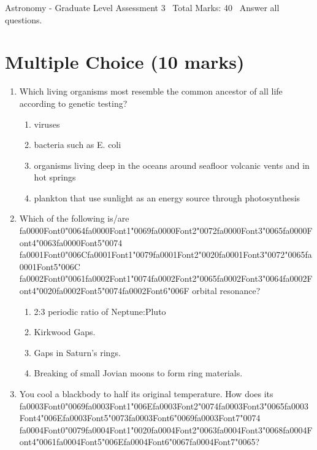 \documentclass[12pt]{article}
\begin{document}
\begin{center}
Astronomy - Graduate Level Assessment 3 \
Total Marks: 40 \
Answer all questions.
\end{center}

\section*{Multiple Choice (10 marks)}
\begin{enumerate}[label=\arabic*.]
\item Which living organisms most resemble the common ancestor of all life according to genetic
testing?
\begin{enumerate}[label=(\alph*)]
    \item viruses
    \item bacteria such as E. coli
    \item organisms living deep in the oceans around seafloor volcanic vents and in hot springs
    \item plankton that use sunlight as an energy source through photosynthesis
\end{enumerate}
\item Which of the following is/are {\csname fa0000Font0\endcsname\char"0064}{\csname fa0000Font1\endcsname\char"0069}{\csname fa0000Font2\endcsname\char"0072}{\csname fa0000Font3\endcsname\char"0065}{\csname fa0000Font4\endcsname\char"0063}{\csname fa0000Font5\endcsname\char"0074} {\csname fa0001Font0\endcsname\char"006C}{\csname fa0001Font1\endcsname\char"0079}{\csname fa0001Font2\endcsname\char"0020}{\csname fa0001Font3\endcsname\char"0072}{\char"0065}{\csname fa0001Font5\endcsname\char"006C} {\csname fa0002Font0\endcsname\char"0061}{\csname fa0002Font1\endcsname\char"0074}{\csname fa0002Font2\endcsname\char"0065}{\csname fa0002Font3\endcsname\char"0064}{\csname fa0002Font4\endcsname\char"0020}{\csname fa0002Font5\endcsname\char"0074}{\csname fa0002Font6\endcsname\char"006F} orbital resonance?
\begin{enumerate}[label=(\alph*)]
    \item 2:3 periodic ratio of Neptune:Pluto
    \item Kirkwood Gaps.
    \item Gaps in Saturn's rings.
    \item Breaking of small Jovian moons to form ring materials.
\end{enumerate}
\item You cool a blackbody to half its original temperature. How does its {\csname fa0003Font0\endcsname\char"0069}{\csname fa0003Font1\endcsname\char"006E}{\csname fa0003Font2\endcsname\char"0074}{\csname fa0003Font3\endcsname\char"0065}{\csname fa0003Font4\endcsname\char"006E}{\csname fa0003Font5\endcsname\char"0073}{\csname fa0003Font6\endcsname\char"0069}{\csname fa0003Font7\endcsname\char"0074} {\csname fa0004Font0\endcsname\char"0079}{\csname fa0004Font1\endcsname\char"0020}{\csname fa0004Font2\endcsname\char"0063}{\csname fa0004Font3\endcsname\char"0068}{\csname fa0004Font4\endcsname\char"0061}{\csname fa0004Font5\endcsname\char"006E}{\csname fa0004Font6\endcsname\char"0067}{\csname fa0004Font7\endcsname\char"0065}?

\end{enumerate}
\end{document}
